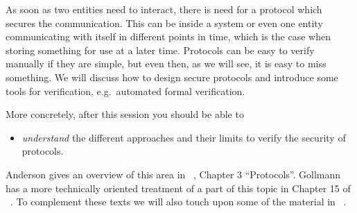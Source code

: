 As soon as two entities need to interact, there is need for a protocol which 
secures the communication.
This can be inside a system or even one entity communicating with itself in 
different points in time, which is the case when storing something for use at 
a later time.
Protocols can be easy to verify manually if they are simple, but even then, as 
we will see, it is easy to miss something.
We will discuss how to design secure protocols and introduce some tools for 
verification, e.g.\ automated formal verification.

More concretely, after this session you should be able to
\begin{itemize}
  \item \emph{understand} the different approaches and their limits to verify 
    the security of protocols.
\end{itemize}

Anderson gives an overview of this area in 
~\cite{Anderson2008sea}, Chapter 
3 \enquote{Protocols}.
Gollmann has a more technically oriented treatment of a part of this topic in 
Chapter 15 of ~\cite{Gollmann2011cs}.
To complement these texts we will also touch upon some of the material in 
~\cite{ProVerif}.
